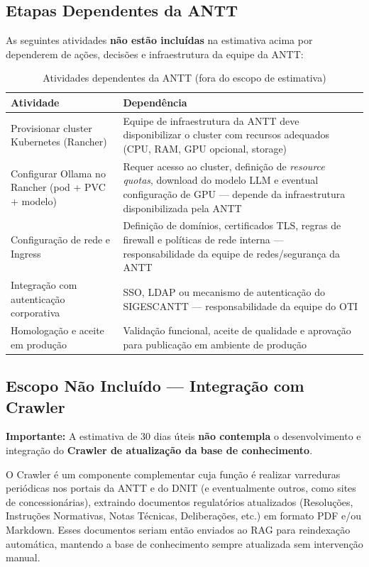 \documentclass[12pt, a4paper]{article}
\begin{document}
\subsection{Etapas Dependentes da ANTT}

As seguintes atividades \textbf{não estão incluídas} na estimativa acima por dependerem de ações, decisões e infraestrutura da equipe da ANTT:

\begin{table}[H]
\centering
\small
\caption{Atividades dependentes da ANTT (fora do escopo de estimativa)}
\label{tab:dependencias_antt}
\begin{tabularx}{\textwidth}{l X}
\toprule
\textbf{Atividade} & \textbf{Dependência} \\
\midrule
Provisionar cluster Kubernetes (Rancher) & Equipe de infraestrutura da ANTT deve disponibilizar o cluster com recursos adequados (CPU, RAM, GPU opcional, storage) \\
Configurar Ollama no Rancher (pod + PVC + modelo) & Requer acesso ao cluster, definição de \textit{resource quotas}, download do modelo LLM e eventual configuração de GPU --- depende da infraestrutura disponibilizada pela ANTT \\
Configuração de rede e Ingress & Definição de domínios, certificados TLS, regras de firewall e políticas de rede interna --- responsabilidade da equipe de redes/segurança da ANTT \\
Integração com autenticação corporativa & SSO, LDAP ou mecanismo de autenticação do SIGESCANTT --- responsabilidade da equipe do OTI \\
Homologação e aceite em produção & Validação funcional, aceite de qualidade e aprovação para publicação em ambiente de produção \\
\bottomrule
\end{tabularx}
\end{table}

\subsection{Escopo Não Incluído --- Integração com Crawler}

\noindent\textbf{Importante:} A estimativa de 30 dias úteis \textbf{não contempla} o desenvolvimento e integração do \textbf{Crawler de atualização da base de conhecimento}.

O Crawler é um componente complementar cuja função é realizar varreduras periódicas nos portais da ANTT e do DNIT (e eventualmente outros, como sites de concessionárias), extraindo documentos regulatórios atualizados (Resoluções, Instruções Normativas, Notas Técnicas, Deliberações, etc.) em formato PDF e/ou Markdown. Esses documentos seriam então enviados ao RAG para reindexação automática, mantendo a base de conhecimento sempre atualizada sem intervenção manual.
\end{document}
